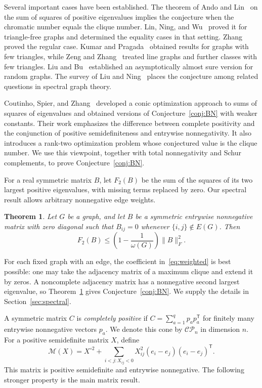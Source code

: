 \documentclass[11pt]{article}
\newtheorem{theorem}{Theorem}[section]
\theoremstyle{remark}
\newcommand{\CP}{\mathcal{CP}}
\newcommand{\M}{\mathcal M}
\newcommand{\F}{F_2}
\newcommand{\fro}[1]{\lVert #1\rVert_F}
\begin{document}
Several important cases have been established. The theorem of Ando and
Lin~\cite{AL} on the sum of squares of positive eigenvalues implies the
conjecture when the chromatic number equals the clique number.
Lin, Ning, and Wu~\cite{LNW} proved it for triangle-free graphs and determined
the equality cases in that setting. Zhang~\cite{Zhang} proved the regular case.
Kumar and Pragada~\cite{KP} obtained results for graphs with few triangles,
while Zeng and Zhang~\cite{ZZ} treated line graphs and further classes with few
triangles. Liu and Bu~\cite{LB} established an asymptotically almost sure
version for random graphs. The survey of Liu and Ning~\cite{LN} places the
conjecture among related questions in spectral graph theory.

Coutinho, Spier, and Zhang~\cite{CSZ} developed a conic optimization approach
to sums of squares of eigenvalues and obtained versions of
Conjecture~\ref{conj:BN} with weaker constants. Their work emphasizes the
difference between complete positivity and the conjunction of positive
semidefiniteness and entrywise nonnegativity. It also introduces a rank-two
optimization problem whose conjectured value is the clique number.
We use this viewpoint, together with total nonnegativity and Schur complements,
to prove Conjecture~\ref{conj:BN}.

For a real symmetric matrix $B$, let $\F(B)$ be the sum of the squares of its
two largest positive eigenvalues, with missing terms replaced by zero.
Our spectral result allows arbitrary nonnegative edge weights.

\begin{theorem}\label{thm:weighted}
Let $G$ be a graph, and let $B$ be a symmetric entrywise nonnegative matrix
with zero diagonal such that $B_{ij}=0$ whenever $\{i,j\}\notin E(G)$.
Then
\begin{equation}\label{eq:weighted}
 \F(B)\le\left(1-\frac1{\omega(G)}\right)\fro{B}^2.
\end{equation}
\end{theorem}

For each fixed graph with an edge, the coefficient in~\eqref{eq:weighted}
is best possible: one may take the adjacency matrix of a maximum clique and
extend it by zeros. A noncomplete adjacency matrix has a nonnegative second
largest eigenvalue, so Theorem~\ref{thm:weighted} gives
Conjecture~\ref{conj:BN}. We supply the details in Section~\ref{sec:spectral}.

A symmetric matrix $C$ is \emph{completely positive} if
$C=\sum_{a=1}^q p_ap_a^{\mathsf T}$ for finitely many entrywise nonnegative
vectors $p_a$. We denote this cone by $\CP_n$ in dimension $n$.
For a positive semidefinite matrix $X$, define
\begin{equation}\label{eq:matrix}
 \M(X)=X^{\circ2}+
 \sum_{i<j:X_{ij}<0}X_{ij}^2(e_i-e_j)(e_i-e_j)^{\mathsf T}.
\end{equation}
This matrix is positive semidefinite and entrywise nonnegative.
The following stronger property is the main matrix result.
\end{document}
